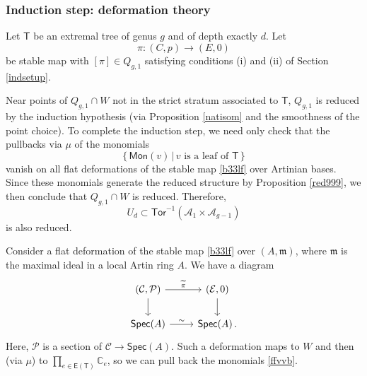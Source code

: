 \documentclass[11pt]{amsart}
\theoremstyle{definition}
\newcommand{\A}{\mathcal{A}}
\newcommand{\Tor}{\mathsf{Tor}}
\begin{document}
{\subsubsection{Induction step: deformation theory}
Let $\mathsf{T}$ be an extremal tree of genus $g$ and of depth exactly $d$. Let 
\begin{equation}
\label{b33lf}
\pi: (C,p) \rightarrow (E,0)
\end{equation}
be stable map with $[\pi] \in Q_{g,1}$ satisfying conditions (i) and (ii) of Section \ref{indsetup}.

Near points of $Q_{g,1}\cap W$ not in the strict stratum associated to $\mathsf{T}$, 
$Q_{g,1}$ is reduced by the induction hypothesis (via Proposition \ref{natisom} and the smoothness of the point choice).
To complete the induction step, we need only check that the pullbacks via $\mu$ of the monomials
\begin{equation} \label{ffvvb}
\{ \, \mathsf{Mon}(v) \, | \,  \text{$v$ is a leaf of $\mathsf{T}$}\, \} 
\end{equation}
vanish on all flat deformations of the stable map \eqref{b33lf}
over Artinian bases. Since these monomials generate the reduced structure by Proposition \ref{red999},
we then conclude that $Q_{g,1}\cap W$ is reduced. Therefore,
$$U_d\subset \Tor^{-1}(\A_1\times \A_{g-1})$$
is also reduced.

Consider a flat deformation of the stable map \eqref{b33lf} over $(A, \mathfrak m)$, where $\mathfrak m$ is the maximal ideal in a local Artin ring $A$. We have a diagram 
\begin{equation}\label{xxyy}\begin{tikzcd}
(\mathcal {C},\mathcal{P}) \arrow[d] \arrow[r, "\widetilde{\pi}"] & (\mathcal{E},0) \arrow[d] \\
\mathsf{Spec}(A)   \arrow[r, "\sim"]     & \mathsf{Spec}(A) \, .                       
\end{tikzcd}
\end{equation} Here, $\mathcal P$ is a section of $\mathcal C\to \mathsf{Spec }(A).$
Such a deformation maps to $W$ and then (via $\mu$) to $\prod_{e\in \mathsf{E}(\mathsf{T})} \mathbb{C}_e$,
so we can pull back the monomials \eqref{ffvvb}. 

}
\end{document}
